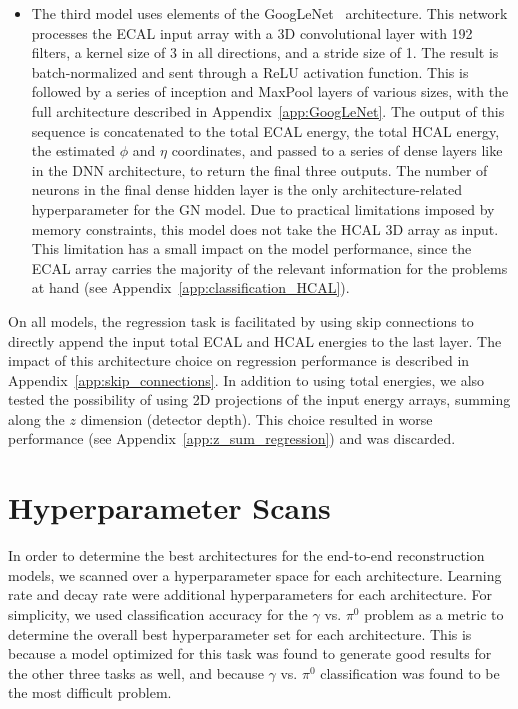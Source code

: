 \begin{itemize}
    \item The third model uses elements of the GoogLeNet~\cite{GoogLeNet} architecture. This network processes the ECAL input array with a 3D convolutional layer with 192 filters, a kernel size of 3 in all directions, and a stride size of 1. The result is batch-normalized and sent through a ReLU activation function. This is followed by a series of inception and MaxPool layers of various sizes, with the full architecture described in Appendix~\ref{app:GoogLeNet}. The output of this sequence is concatenated to the total ECAL energy, the total HCAL energy, the estimated $\phi$ and $\eta$ coordinates, and passed to a series of dense layers like in the DNN architecture, to return the final three outputs. The number of neurons in the final dense hidden layer is the only architecture-related hyperparameter for the GN model. Due to practical limitations imposed by memory constraints, this model does not take the HCAL 3D array as input. This limitation has a small impact on the model performance, since the ECAL array carries the majority of the relevant information for the problems at hand (see Appendix~\ref{app:classification_HCAL}).
\end{itemize}

On all models, the regression task is facilitated by using skip connections to directly append the input total ECAL and HCAL energies to the last layer. The impact of this architecture choice on regression performance is described in Appendix~\ref{app:skip_connections}. In addition to using total energies, we also tested the possibility of using 2D projections of the input energy arrays, summing along the $z$ dimension (detector depth). This choice resulted in worse performance (see Appendix~\ref{app:z_sum_regression}) and was discarded.

\section{Hyperparameter Scans}
\label{sec:hpscan}

In order to determine the best architectures for the end-to-end reconstruction models, we scanned over a hyperparameter space for each architecture. Learning rate and decay rate were additional hyperparameters for each architecture. For simplicity, we used classification accuracy for the $\gamma$ vs. $\pi^0$ problem as a metric to determine the overall best hyperparameter set for each architecture. This is because a model optimized for this task was found to generate good results for the other three tasks as well, and because $\gamma$ vs. $\pi^0$ classification was found to be the most difficult problem.

